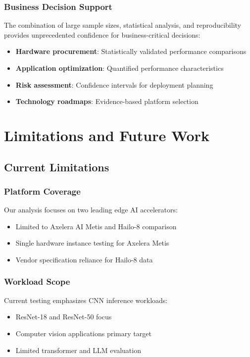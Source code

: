 \documentclass[manuscript]{acmart}
\begin{document}
\subsubsection{Business Decision Support}
The combination of large sample sizes, statistical analysis, and reproducibility provides unprecedented confidence for business-critical decisions:

\begin{itemize}
    \item \textbf{Hardware procurement}: Statistically validated performance comparisons
    \item \textbf{Application optimization}: Quantified performance characteristics
    \item \textbf{Risk assessment}: Confidence intervals for deployment planning
    \item \textbf{Technology roadmaps}: Evidence-based platform selection
\end{itemize}

\section{Limitations and Future Work}

\subsection{Current Limitations}

\subsubsection{Platform Coverage}
Our analysis focuses on two leading edge AI accelerators:
\begin{itemize}
    \item Limited to Axelera AI Metis and Hailo-8 comparison
    \item Single hardware instance testing for Axelera Metis
    \item Vendor specification reliance for Hailo-8 data
\end{itemize}

\subsubsection{Workload Scope}
Current testing emphasizes CNN inference workloads:
\begin{itemize}
    \item ResNet-18 and ResNet-50 focus
    \item Computer vision applications primary target
    \item Limited transformer and LLM evaluation
\end{itemize}
\end{document}
